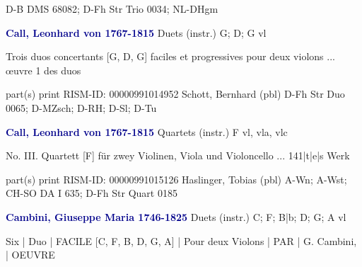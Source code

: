 \documentclass[twocolumn]{book}
\begin{document}
\newline D-B  DMS 68082; D-Fh  Str Trio 0034; NL-DHgm
\newline \par \vspace{7pt} \textcolor{darkblue}{\textbf{Call, Leonhard von  1767-1815}}
\newline Duets (instr.)  G; D; G  
 vl
\newline \begin{itshape}Trois duos concertants [G, D, G] faciles et progressives pour deux violons ... œuvre 1 des duos\end{itshape} 
\newline \textcolor{darkblue}{}  part(s)  
\newline print
\newline RISM-ID: 00000991014952
\newline Schott, Bernhard  (pbl)
\newline D-Fh  Str Duo 0065; D-MZsch; D-RH; D-Sl; D-Tu
\newline \par \vspace{7pt} \textcolor{darkblue}{\textbf{Call, Leonhard von  1767-1815}}
\newline Quartets (instr.)  F  
 vl, vla, vlc
\newline \begin{itshape}No. III. Quartett [F] für zwey Violinen, Viola und Violoncello ... 141|t|e|s Werk\end{itshape} 
\newline \textcolor{darkblue}{}  part(s)  
\newline print
\newline RISM-ID: 00000991015126
\newline Haslinger, Tobias  (pbl)
\newline A-Wn; A-Wst; CH-SO  DA I 635; D-Fh  Str Quart 0185
\newline \par \vspace{7pt} \textcolor{darkblue}{\textbf{Cambini, Giuseppe Maria  1746-1825}}
\newline Duets (instr.)  C; F; B|b; D; G; A  
 vl
\newline \begin{itshape}Six | Duo | FACILE [C, F, B, D, G, A] | Pour deux Violons | PAR | G. Cambini, | OEUVRE\end{itshape} 
\end{document}
